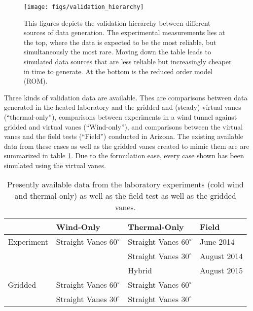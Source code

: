 %
%
 \begin{figure}[!htb]
   \begin{center}
    \texttt{[image: figs/validation\_hierarchy]}
    \caption{This figures depicts the validation hierarchy between
    different sources of data generation. The experimental measurements
    lies at the top, where the data is expected to be the most reliable,
    but simultaneously the most rare. Moving down the table leads to
    simulated data sources that are less reliable but increasingly
    cheaper in time to generate. At the bottom is the reduced order
    model (ROM).} 
    \label{fig:val_hier}
   \end{center}
 \end{figure}

Three kinds of validation data are available. Thes are comparisons
between data generated in the heated laboratory and the gridded and
(steady) virtual vanes (``thermal-only''), comparisons between
experiments in a wind tunnel against gridded and virtual vanes
(``Wind-only''), and comparisons between the virtual vanes and the field
tests (``Field'') conducted in Arizona. The existing available data from
these cases as well as the gridded vanes created to mimic them are are
summarized in table \ref{tab:val_data}. Due to the formulation ease,
every case shown has been simulated using the virtual vanes.  

\large
\begin{table}[h]
\centering
\label{my-label}
\begin{tabular}{l|l|l|l|}
           & Wind-Only                   & Thermal-Only               & Field  \\
  \hline 
Experiment & Straight Vanes $60^{\circ}$ & Straight Vanes $60^{\circ}$ & June 2014   \\
           &                           & Straight Vanes $30^{\circ}$   & August 2014 \\
           &                           & Hybrid                        & August 2015 \\
  \hline 
Gridded    & Straight Vanes $60^{\circ}$ & Straight Vanes $60^{\circ}$ & \\
           & Straight Vanes $30^{\circ}$ & Straight Vanes $30^{\circ}$ & \\
  \hline 
\end{tabular}
  \caption{Presently available data from the laboratory experiments 
    (cold wind and thermal-only) as well as the field test as well as
 the gridded vanes. } 
  \label{tab:val_data}
\end{table}
%
%
%
%
%

